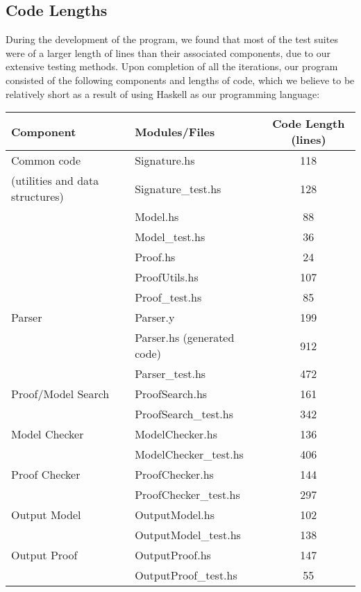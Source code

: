 \subsection{Code Lengths}

During the development of the program, we found that most of the test suites were of a larger length of lines than their associated components, due to our extensive testing methods. Upon completion of all the iterations, our program consisted of the following components and lengths of code, which we believe to be relatively short as a result of using Haskell as our programming language:

\begin{center}
  \begin{tabular}{|l|l|c|}
\hline
\textbf{Component} & \textbf{Modules/Files} & \textbf{Code Length (lines)} \\
\hline
    Common code & Signature.hs & 118 \\
    (utilities and data structures) & Signature\_test.hs & 128 \\
     & Model.hs & 88 \\
     & Model\_test.hs & 36 \\
     & Proof.hs & 24 \\
     & ProofUtils.hs & 107 \\
     & Proof\_test.hs & 85 \\
\hline
    Parser & Parser.y & 199 \\
     & Parser.hs (generated code) & 912 \\
     & Parser\_test.hs & 472 \\
\hline
    Proof/Model Search & ProofSearch.hs & 161 \\
     & ProofSearch\_test.hs & 342 \\
\hline
   Model Checker & ModelChecker.hs & 136 \\
    & ModelChecker\_test.hs & 406 \\
\hline
   Proof Checker & ProofChecker.hs & 144 \\
    & ProofChecker\_test.hs & 297 \\
\hline
   Output Model & OutputModel.hs & 102 \\
    & OutputModel\_test.hs & 138 \\
\hline
   Output Proof & OutputProof.hs & 147 \\
    & OutputProof\_test.hs & 55 \\
\hline
\end{tabular}
\end{center}
